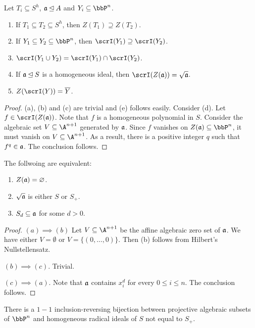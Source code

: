\begin{proposition}
    Let $T_i\subseteq S^h$, $\mathfrak a\unlhd A$ and $Y_i\subseteq\bbP^n$.
    \begin{enumerate}[label=(\alph*)]
        \item If $T_1\subseteq T_2\subseteq S^h$, then $Z(T_1)\supseteq Z(T_2)$. 
        \item If $Y_1\subseteq Y_2\subseteq\bbP^n$, then $\scrI(Y_1)\supseteq\scrI(Y_2)$. 
        \item $\scrI(Y_1\cup Y_2) = \scrI(Y_1)\cap\scrI(Y_2)$. 
        \item If $\mathfrak a\unlhd S$ is a homogeneous ideal, then $\scrI(Z(\fraka)) = \sqrt{\fraka}$.
        \item $Z(\scrI(Y)) = \overline Y$.
    \end{enumerate}
\end{proposition}
\begin{proof}
    (a), (b) and (c) are trivial and (e) follows easily. Consider (d). Let $f\in\scrI(Z(\fraka))$. Note that $f$ is a homogeneous polynomial in $S$. Consider the algebraic set  $V\subseteq\A^{n + 1}$ generated by $\mathfrak a$. Since $f$ vanishes on $Z(\fraka)\subseteq\bbP^n$, it must vanish on $V\subseteq\A^{n + 1}$. As a result, there is a positive integer $q$ such that $f^q\in\mathfrak a$. The conclusion follows.
\end{proof}

\begin{proposition}
    The follwoing are equivalent: 
    \begin{enumerate}[label=(\alph*)]
        \item $Z(\mathfrak a) = \varnothing$. 
        \item $\sqrt{\mathfrak a}$ is either $S$ or $S_+$. 
        \item $S_d\subseteq\mathfrak a$ for some $d > 0$.
    \end{enumerate}
\end{proposition}
\begin{proof}
    $(a)\implies(b)$ Let $V\subseteq\A^{n + 1}$ be the affine algebraic zero set of $\mathfrak a$. We have either $V = \emptyset$ or $V = \{(0,\dots, 0)\}$. Then (b) follows from Hilbert's Nullstellensatz.

    $(b)\implies(c)$. Trivial. 

    $(c)\implies(a)$. Note that $\mathfrak a$ contains $x_i^d$ for every $0\le i\le n$. The conclusion follows.
\end{proof}

\begin{corollary}
    There is a $1-1$ inclusion-reversing bijection between projective algebraic subsets of $\bbP^n$ and homogeneous radical ideals of $S$ not equal to $S_+$.
\end{corollary}

